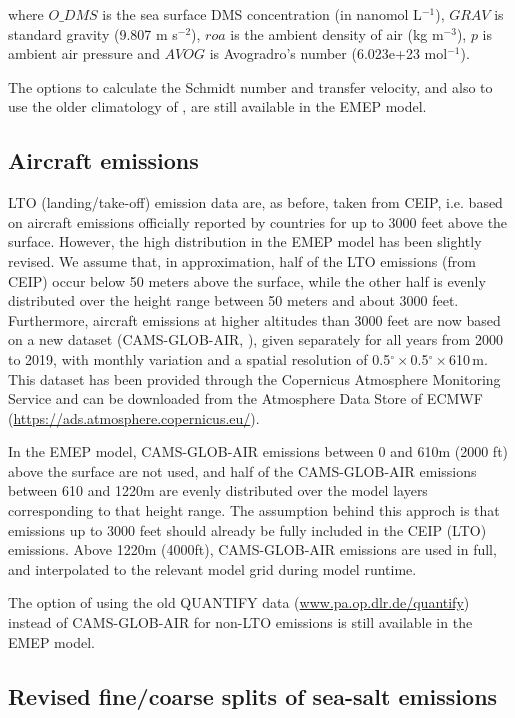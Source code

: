 where $O\_DMS$ is the sea surface DMS concentration (in nanomol L$^{-1}$),
$GRAV$ is standard gravity (9.807 m s$^{-2}$),
$roa$ is the ambient density of air (kg m$^{-3}$),
$p$ is ambient air pressure
and $AVOG$ is Avogradro's number (6.023e+23 mol$^{-1}$).

The options to calculate the Schmidt number and transfer velocity, and also to use the older climatology of \citet{Kettle1999}, are still available in the EMEP model.

\subsection{Aircraft emissions}
\label{ssec:Aircraft}

 LTO (landing/take-off) emission data are, as before, taken from CEIP, i.e. based on aircraft emissions officially reported by countries for up to 3000 feet above the surface. However, the high distribution in the EMEP model has been slightly revised. We assume that, in approximation, half of the LTO emissions (from CEIP) occur below 50 meters above the surface, while the other half is evenly distributed over the height range between 50 meters and about 3000 feet.
 Furthermore, aircraft emissions at higher altitudes than 3000 feet are now based on a new dataset (CAMS-GLOB-AIR, \citet{GranierCAMS2019}), given separately for all years from 2000 to 2019, with monthly variation and a spatial resolution of 0.5$^\circ$\,$\times$\,0.5$^\circ$\,$\times$\,610\,m. This dataset has been provided through the Copernicus Atmosphere Monitoring Service and can be downloaded from the Atmosphere Data Store of ECMWF (\url{https://ads.atmosphere.copernicus.eu/}).

In the EMEP model, CAMS-GLOB-AIR emissions between 0 and 610m (2000 ft) above the surface are not used, and half of the CAMS-GLOB-AIR emissions between 610 and 1220m are evenly distributed over the model layers corresponding to that height range. The assumption behind this approch is that emissions up to 3000 feet should already be fully included in the CEIP (LTO) emissions. Above 1220m (4000ft), CAMS-GLOB-AIR emissions are used in full, and interpolated to the relevant model grid during model runtime.

The option of using the old QUANTIFY data (\url{www.pa.op.dlr.de/quantify}) instead of CAMS-GLOB-AIR for non-LTO emissions is still available in the EMEP model.

\subsection{Revised fine/coarse splits of sea-salt emissions}
\label{ssec:updateSS}

